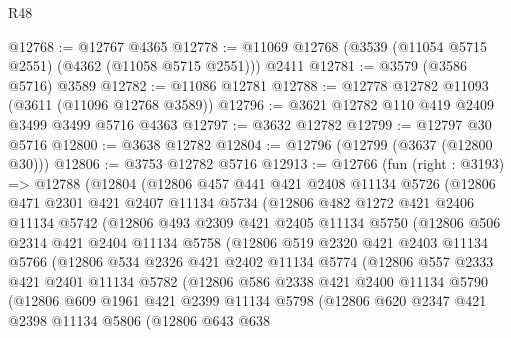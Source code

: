 \begin{lexlean}{R48}
\begin{coremodule}
@12768 := @12767 @4365
@12778 := @11069 @12768 (@3539 (@11054 @5715 @2551) (@4362 (@11058 @5715 @2551))) @2411
@12781 := @3579 (@3586 @5716) @3589
@12782 := @11086 @12781
@12788 := @12778 @12782 @11093 (@3611 (@11096 @12768 @3589))
@12796 := @3621 @12782 @110 @419 @2409 @3499 @3499 @5716 @4363
@12797 := @3632 @12782
@12799 := @12797 @30 @5716
@12800 := @3638 @12782
@12804 := @12796 (@12799 (@3637 (@12800 @30)))
@12806 := @3753 @12782 @5716
@12913 := @12766
    (fun (right : @3193) =>
    @12788
      (@12804
        (@12806
          @457
          @441
          @421
          @2408
          @11134
          @5726
          (@12806
            @471
            @2301
            @421
            @2407
            @11134
            @5734
            (@12806
              @482
              @1272
              @421
              @2406
              @11134
              @5742
              (@12806
                @493
                @2309
                @421
                @2405
                @11134
                @5750
                (@12806
                  @506
                  @2314
                  @421
                  @2404
                  @11134
                  @5758
                  (@12806
                    @519
                    @2320
                    @421
                    @2403
                    @11134
                    @5766
                    (@12806
                      @534
                      @2326
                      @421
                      @2402
                      @11134
                      @5774
                      (@12806
                        @557
                        @2333
                        @421
                        @2401
                        @11134
                        @5782
                        (@12806
                          @586
                          @2338
                          @421
                          @2400
                          @11134
                          @5790
                          (@12806
                            @609
                            @1961
                            @421
                            @2399
                            @11134
                            @5798
                            (@12806
                              @620
                              @2347
                              @421
                              @2398
                              @11134
                              @5806
                              (@12806
                                @643
                                @638

\end{coremodule}
\end{lexlean}

